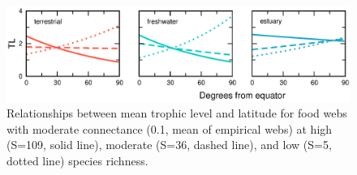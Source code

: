 \documentclass[12pt]{article}
\begin{document}
\begin{figure}[!h]
\label{TL_all}
\includegraphics[width=.9\textwidth]{Figures/TL_all.eps}
\caption{Relationships between mean trophic level and latitude for food webs with moderate connectance (0.1, mean of empirical webs) at high (S=109, solid line), moderate (S=36, dashed line), and low (S=5, dotted line) species richness.}
\end{figure}



\end{document}
